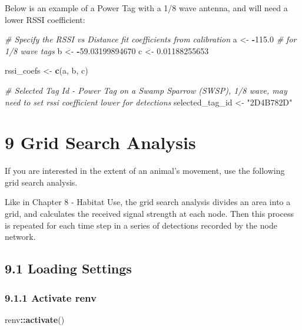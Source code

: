 \documentclass[
]{book}
\newenvironment{Shaded}{\begin{snugshade}}{\end{snugshade}}
\newcommand{\CommentTok}[1]{\textcolor[rgb]{0.56,0.35,0.01}{\textit{#1}}}
\newcommand{\FloatTok}[1]{\textcolor[rgb]{0.00,0.00,0.81}{#1}}
\newcommand{\FunctionTok}[1]{\textcolor[rgb]{0.13,0.29,0.53}{\textbf{#1}}}
\newcommand{\NormalTok}[1]{#1}
\newcommand{\OtherTok}[1]{\textcolor[rgb]{0.56,0.35,0.01}{#1}}
\newcommand{\SpecialCharTok}[1]{\textcolor[rgb]{0.81,0.36,0.00}{\textbf{#1}}}
\newcommand{\StringTok}[1]{\textcolor[rgb]{0.31,0.60,0.02}{#1}}
\begin{document}
Below is an example of a Power Tag with a 1/8 wave antenna, and will need a lower RSSI coefficient:

\begin{Shaded}
\begin{Highlighting}[]
\CommentTok{\# Specify the RSSI vs Distance fit coefficients from calibration}
\NormalTok{a }\OtherTok{\textless{}{-}} \SpecialCharTok{{-}}\FloatTok{115.0} \CommentTok{\# for 1/8 wave tags}
\NormalTok{b }\OtherTok{\textless{}{-}} \SpecialCharTok{{-}}\FloatTok{59.03199894670}
\NormalTok{c }\OtherTok{\textless{}{-}} \FloatTok{0.01188255653}

\NormalTok{rssi\_coefs }\OtherTok{\textless{}{-}} \FunctionTok{c}\NormalTok{(a, b, c)}

\CommentTok{\# Selected Tag Id {-} Power Tag on a Swamp Sparrow (SWSP), 1/8 wave, may need to set rssi coefficient lower for detections}
\NormalTok{selected\_tag\_id }\OtherTok{\textless{}{-}} \StringTok{"2D4B782D"}
\end{Highlighting}
\end{Shaded}

\chapter{9 Grid Search Analysis}\label{grid-search-analysis}

If you are interested in the extent of an animal's movement, use the following grid search analysis.

Like in Chapter 8 - Habitat Use, the grid search analysis divides an area into a grid, and calculates the received signal strength at each node. Then this process is repeated for each time step in a series of detections recorded by the node network.

\section{9.1 Loading Settings}\label{loading-settings}

\subsection{9.1.1 Activate renv}\label{activate-renv-1}

\begin{Shaded}
\begin{Highlighting}[]
\NormalTok{renv}\SpecialCharTok{::}\FunctionTok{activate}\NormalTok{()}
\end{Highlighting}
\end{Shaded}
\end{document}
